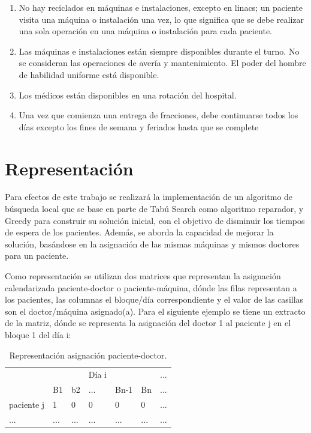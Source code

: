 \documentclass[letter, 10pt]{article}
\begin{document}
\begin{enumerate}
\item No hay reciclados en máquinas e instalaciones, excepto en linacs; un paciente visita una máquina o instalación una vez, lo que significa que se debe realizar una sola operación en una máquina o instalación para cada paciente.
\item Las máquinas e instalaciones están siempre disponibles durante el turno. No se consideran las operaciones de avería y mantenimiento. El poder del hombre de habilidad uniforme está disponible.
\item Los médicos están disponibles en una rotación del hospital.
\item Una vez que comienza una entrega de fracciones, debe continuarse todos los días excepto los fines de semana y feriados hasta que se complete
\end{enumerate}




\section{Representación}
Para efectos de este trabajo se realizará la implementación de un algoritmo de búsqueda local que se base en parte de Tabú Search como algoritmo reparador, y Greedy para construir su solución inicial, con el objetivo de disminuir los tiempos de espera de los pacientes. Además, se aborda la capacidad de mejorar la solución, basándose en la asignación de las mismas máquinas y mismos doctores para un paciente.

Como representación se utilizan dos matrices que representan la asignación calendarizada paciente-doctor o paciente-máquina, dónde las filas representan a los pacientes, las columnas el bloque/día correspondiente y el valor de las casillas son el doctor/máquina asignado(a).
Para el siguiente ejemplo se tiene un extracto de la matriz, dónde se representa la asignación del doctor 1 al paciente j en el bloque 1 del día i:



\begin{table}[ht]
\centering
\begin{tabular}{l|lllll|l|}
\cline{2-7}
 &  &  & Día i &  &  & ... \\ \cline{2-7} 
& \multicolumn{1}{l|}{B1}  & \multicolumn{1}{l|}{b2}  &\multicolumn{1}{l|}{...} & \multicolumn{1}{l|}{Bn-1} & Bn  & ... \\ \hline
\multicolumn{1}{|l|}{paciente j} & \multicolumn{1}{l|}{1}   & \multicolumn{1}{l|}{0}   & \multicolumn{1}{l|}{0}   & \multicolumn{1}{l|}{0}    & 0   & ... \\ \hline
\multicolumn{1}{|l|}{...}        & \multicolumn{1}{l|}{...} & \multicolumn{1}{l|}{...} & \multicolumn{1}{l|}{...} & \multicolumn{1}{l|}{...}  & ... & ... \\ \hline
\end{tabular}
\caption{Representación asignación paciente-doctor.}
\label{table:ta}
\end{table}
\end{document}

